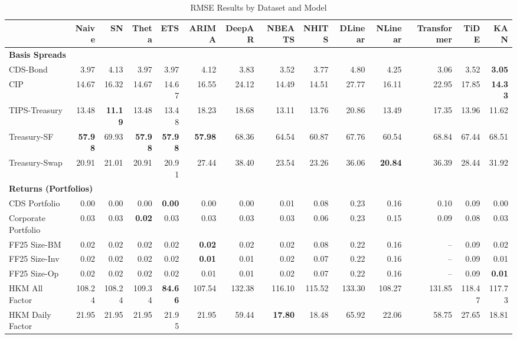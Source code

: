 
\begin{table}[htbp]
\centering
\caption{RMSE Results by Dataset and Model}
\label{tab:rmse_results}
\scriptsize
\setlength{\tabcolsep}{1.5pt}
\renewcommand{\arraystretch}{0.9}
\begin{tabular}{@{}lrrrrrrrrrrrrr@{}}
\toprule
 & Naive & SN & Theta & ETS & ARIMA & DeepAR & NBEATS & NHITS & DLinear & NLinear & Transformer & TiDE & KAN \\
\midrule
\multicolumn{14}{l}{\textbf{Basis Spreads}} \\
CDS-Bond & 3.97 & 4.13 & 3.97 & 3.97 & 4.12 & 3.83 & 3.52 & 3.77 & 4.80 & 4.25 & 3.06 & 3.52 & \textbf{3.05} \\
CIP & 14.67 & 16.32 & 14.67 & 14.67 & 16.55 & 24.12 & 14.49 & 14.51 & 27.77 & 16.11 & 22.95 & 17.85 & \textbf{14.33} \\
TIPS-Treasury & 13.48 & \textbf{11.19} & 13.48 & 13.48 & 18.23 & 18.68 & 13.11 & 13.76 & 20.86 & 13.49 & 17.35 & 13.96 & 11.62 \\
Treasury-SF & \textbf{57.98} & 69.93 & \textbf{57.98} & \textbf{57.98} & \textbf{57.98} & 68.36 & 64.54 & 60.87 & 67.76 & 60.54 & 68.84 & 67.44 & 68.51 \\
Treasury-Swap & 20.91 & 21.01 & 20.91 & 20.91 & 27.44 & 38.40 & 23.54 & 23.26 & 36.06 & \textbf{20.84} & 36.39 & 28.44 & 31.92 \\
\midrule
\multicolumn{14}{l}{\textbf{Returns (Portfolios)}} \\
CDS Portfolio & 0.00 & 0.00 & 0.00 & \textbf{0.00} & 0.00 & 0.00 & 0.01 & 0.08 & 0.23 & 0.16 & 0.10 & 0.09 & 0.00 \\
Corporate Portfolio & 0.03 & 0.03 & \textbf{0.02} & 0.03 & 0.03 & 0.03 & 0.03 & 0.06 & 0.23 & 0.15 & 0.09 & 0.08 & 0.03 \\
FF25 Size-BM & 0.02 & 0.02 & 0.02 & 0.02 & \textbf{0.02} & 0.02 & 0.02 & 0.08 & 0.22 & 0.16 & -- & 0.09 & 0.02 \\
FF25 Size-Inv & 0.02 & 0.02 & 0.02 & 0.02 & \textbf{0.01} & 0.01 & 0.02 & 0.07 & 0.22 & 0.16 & -- & 0.09 & 0.01 \\
FF25 Size-Op & 0.02 & 0.02 & 0.02 & 0.02 & 0.01 & 0.01 & 0.02 & 0.07 & 0.22 & 0.16 & -- & 0.09 & \textbf{0.01} \\
HKM All Factor & 108.24 & 108.24 & 109.34 & \textbf{84.66} & 107.54 & 132.38 & 116.10 & 115.52 & 133.30 & 108.27 & 131.85 & 118.47 & 117.73 \\
HKM Daily Factor & 21.95 & 21.95 & 21.95 & 21.95 & 21.95 & 59.44 & \textbf{17.80} & 18.48 & 65.92 & 22.06 & 58.75 & 27.65 & 18.81 \\

\end{tabular}
\end{table}

